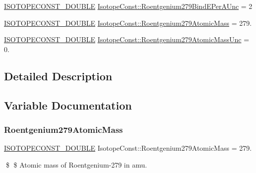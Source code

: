 \begin{DoxyCompactItemize}
\item 
\mbox{\hyperlink{group___isotope_const-_macros_ga8f45a7272ce02c0b4c65c44636ed719a}{I\+S\+O\+T\+O\+P\+E\+C\+O\+N\+S\+T\+\_\+\+D\+O\+U\+B\+LE}} \mbox{\hyperlink{group___isotope_const-_roentgenium-_rg279_gadd987ecd261642f18404c0e2cf6f2297}{Isotope\+Const\+::\+Roentgenium279\+Bind\+E\+Per\+A\+Unc}} = 2
\item 
\mbox{\hyperlink{group___isotope_const-_macros_ga8f45a7272ce02c0b4c65c44636ed719a}{I\+S\+O\+T\+O\+P\+E\+C\+O\+N\+S\+T\+\_\+\+D\+O\+U\+B\+LE}} \mbox{\hyperlink{group___isotope_const-_roentgenium-_rg279_ga3aaa43e9e42924d6c1208f19ca5d15a1}{Isotope\+Const\+::\+Roentgenium279\+Atomic\+Mass}} = 279.
\item 
\mbox{\hyperlink{group___isotope_const-_macros_ga8f45a7272ce02c0b4c65c44636ed719a}{I\+S\+O\+T\+O\+P\+E\+C\+O\+N\+S\+T\+\_\+\+D\+O\+U\+B\+LE}} \mbox{\hyperlink{group___isotope_const-_roentgenium-_rg279_ga55f743a04e0f7d1efc3f03a550b3d456}{Isotope\+Const\+::\+Roentgenium279\+Atomic\+Mass\+Unc}} = 0.
\end{DoxyCompactItemize}


\subsection{Detailed Description}


\subsection{Variable Documentation}
\mbox{\label{group___isotope_const-_roentgenium-_rg279_ga3aaa43e9e42924d6c1208f19ca5d15a1}} 
\subsubsection{\texorpdfstring{Roentgenium279\+Atomic\+Mass}{Roentgenium279AtomicMass}}
{\footnotesize\ttfamily \mbox{\hyperlink{group___isotope_const-_macros_ga8f45a7272ce02c0b4c65c44636ed719a}{I\+S\+O\+T\+O\+P\+E\+C\+O\+N\+S\+T\+\_\+\+D\+O\+U\+B\+LE}} Isotope\+Const\+::\+Roentgenium279\+Atomic\+Mass = 279.}

\$ \$ Atomic mass of Roentgenium-\/279 in amu. \mbox{\label{group___isotope_const-_roentgenium-_rg279_ga55f743a04e0f7d1efc3f03a550b3d456}} 
